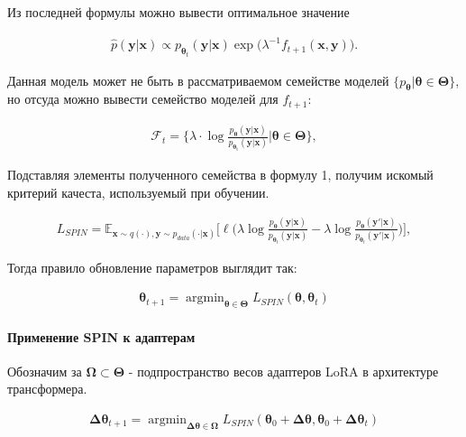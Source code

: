 \documentclass[12pt, twoside]{article}
\newcommand{\bx}{\mathbf{x}}
\newcommand{\by}{\mathbf{y}}
\newcommand{\bOmega}{\boldsymbol{\Omega}}
\newcommand{\btheta}{\boldsymbol{\theta}}
\newcommand{\bTheta}{\boldsymbol{\Theta}}
\newcommand{\bDelta}{\boldsymbol{\Delta}}
\newcommand{\cF}{\mathcal{F}}
\newcommand{\EE}{\mathbb{E}}
\newcommand{\argmin}{\mathop{\mathrm{argmin}}}
\begin{document}
Из последней формулы можно вывести оптимальное значение 

\begin{align}
\hat{p}(\by|\bx) \propto p_{\btheta_t}(\by|\bx) \exp\big(\lambda^{-1}f_{t+1}(\bx, \by)\big). \label{eq:closed form solution}  
\end{align}

Данная модель может не быть в рассматриваемом семействе моделей $\{p_{\btheta} | \btheta \in \bTheta\}$, но отсуда можно вывести семейство моделей для $f_{t+1}$:

\begin{align}
\cF_{t} = \bigg\{\lambda\cdot \log \frac{p_{\btheta}(\by | \bx)}{p_{\mathrm{\btheta_t}}(\by | \bx)}\bigg|\btheta \in \bTheta\bigg\},   \label{eq:function class0} 
\end{align}

Подставляя элементы полученного семейства в формулу 1, получим искомый критерий качеста, используемый при обучении.

\begin{align}
L_{SPIN}= \EE_{\bx\sim q(\cdot), \by\sim p_{data}(\cdot | \bx)}\bigg[\ell\bigg(\lambda \log \frac{p_{\btheta}(\by | \bx)}{p_{\btheta_t}(\by | \bx)}-\lambda \log \frac{p_{\btheta}(\by' | \bx)}{p_{\btheta_t}(\by' | \bx)}\bigg)\bigg], \label{eq:loss}  
\end{align}

Тогда правило обновление параметров выглядит так:

\begin{align}
    \btheta_{t+1} = \argmin_{\btheta \in \bTheta} L_{SPIN} (\btheta, \btheta_t)
\end{align}


\paragraph{Применение SPIN к адаптерам}

Обозначим за $\bOmega \subset \bTheta$ - подпространство весов адаптеров LoRA в архитектуре трансформера.

\begin{align}
    \bDelta\btheta_{t+1} = \argmin_{\bDelta\btheta \in \bOmega} L_{SPIN} (\btheta_0 + \bDelta\btheta, \btheta_0 + \bDelta \btheta_t)
\end{align}

\printbibliography
\end{document}
